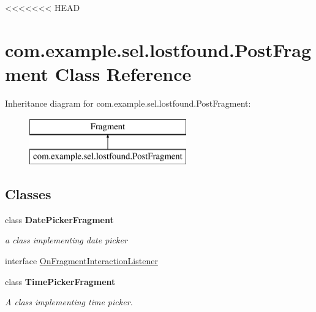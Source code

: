 <<<<<<< HEAD
\hypertarget{classcom_1_1example_1_1sel_1_1lostfound_1_1PostFragment}{\section{com.\-example.\-sel.\-lostfound.\-Post\-Fragment Class Reference}
\label{classcom_1_1example_1_1sel_1_1lostfound_1_1PostFragment}
}
Inheritance diagram for com.\-example.\-sel.\-lostfound.\-Post\-Fragment\-:\begin{figure}[H]
\begin{center}
\leavevmode
\includegraphics[height=2.000000cm]{classcom_1_1example_1_1sel_1_1lostfound_1_1PostFragment}
\end{center}
\end{figure}
\subsection*{Classes}
\begin{DoxyCompactItemize}
\item 
class {\bfseries Date\-Picker\-Fragment}
\begin{DoxyCompactList}\small\item\em a class implementing date picker \end{DoxyCompactList}\item 
interface \hyperlink{interfacecom_1_1example_1_1sel_1_1lostfound_1_1PostFragment_1_1OnFragmentInteractionListener}{On\-Fragment\-Interaction\-Listener}
\item 
class {\bfseries Time\-Picker\-Fragment}
\begin{DoxyCompactList}\small\item\em A class implementing time picker. \end{DoxyCompactList}\end{DoxyCompactItemize}
